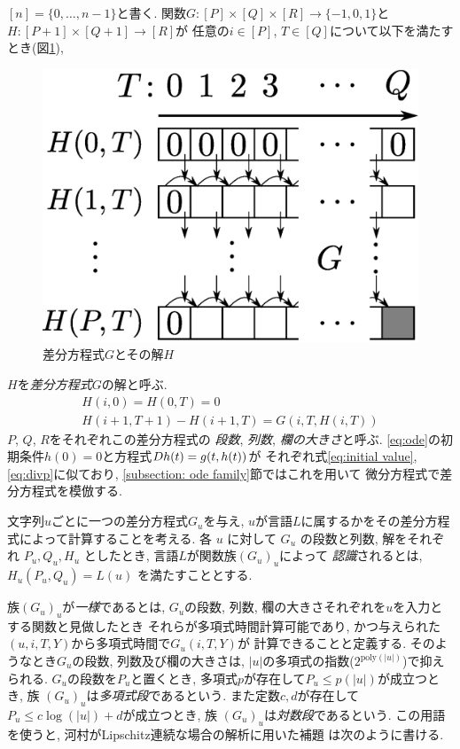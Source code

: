 $[n] = \{0, \dots , n-1\}$と書く.
関数$G \colon [P] \times [Q] \times [R] \to \{-1, 0, 1\}$と
$H \colon [P + 1] \times [Q+1] \to [R]$が
任意の$i \in [P]$, $T \in [Q]$について以下を満たすとき(図\ref{fig:divp}), 
\begin{figure}
 \begin{center}
  \includegraphics[height=0.15\textheight]{image/divp.eps}
 \end{center}
 \caption{差分方程式$G$とその解$H$}
 \label{fig:divp}
\end{figure}
$H$を\emph{差分方程式}\kern\xkanjiskip$G$の解と呼ぶ.
\begin{gather}
   H(i, 0) = H(0, T) = 0 \label{eq:initial value}
\\
   H(i + 1, T + 1) - H(i+1, T) = G(i, T, H(i, T))  \label{eq:divp}
\end{gather}
$P$, $Q$, $R$をそれぞれこの差分方程式の
\emph{段数}, \emph{列数}, \emph{欄の大きさ}と呼ぶ.
\eqref{eq:ode}の初期条件$h(0) = 0$と方程式$D h(t) = g(t, h(t))$が
それぞれ式\eqref{eq:initial value}, \eqref{eq:divp}に似ており, 
\ref{subsection: ode family}節ではこれを用いて
微分方程式で差分方程式を模倣する. 


文字列$u$ごとに一つの差分方程式$G _u$を与え,
$u$が言語$L$に属するかをその差分方程式によって計算することを考える.
各 $u$ に対して $G_u$ の段数と列数, 解をそれぞれ $P_u, Q_u, H_u$ としたとき,
言語$L$が関数族$(G_u)_u$によって
\emph{認識}されるとは,
$H_u(P_u, Q_u) = L(u)$ を満たすこととする.

族$(G_u)_u$が\emph{一様}であるとは,
$G_u$の段数, 列数, 欄の大きさそれぞれを$u$を入力とする関数と見做したとき
それらが多項式時間計算可能であり,
かつ与えられた$(u, i, T, Y)$から多項式時間で$G_u(i, T, Y)$が
計算できることと定義する.
そのようなとき$G _u$の段数, 列数及び欄の大きさは,
$|u|$の多項式の指数($2^{\mathrm{poly} (|u|)}$)で抑えられる.
$G_u$の段数を$P_u$と置くとき, 多項式$p$が存在して$P_u \le p(|u|)$が成立つとき,
族 $(G_u) _u$は\emph{多項式段}であるという.
また定数$c,d$が存在して$P_u \le c \log(|u|)+d$が成立つとき,
族 $(G_u) _u$は\emph{対数段}であるという. 
この用語を使うと, 
河村がLipschitz連続な場合の解析に用いた補題
\cite[補題4.7]{kawamura2010lipschitz}は次のように書ける. 

